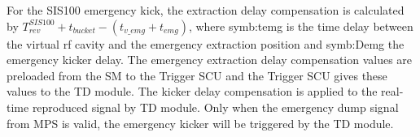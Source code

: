 For the SIS100 emergency kick, the extraction delay compensation is calculated by $T_{\mathit{rev}}^{\mathit{SIS100}} + t_{bucket} - (t_{v\_emg} + t_{emg})$, where \gls{symb:temg} is the time delay between the virtual rf cavity and the emergency extraction position and \gls{symb:Demg} the emergency kicker delay. The emergency extraction delay compensation values are preloaded from the SM to the Trigger SCU and the Trigger SCU gives these values to the TD module. The kicker delay compensation is applied to the real-time reproduced signal by TD module. Only when the emergency dump signal from MPS is valid, the emergency kicker will be triggered by the TD module.


%
%
%
%
%
%
%
